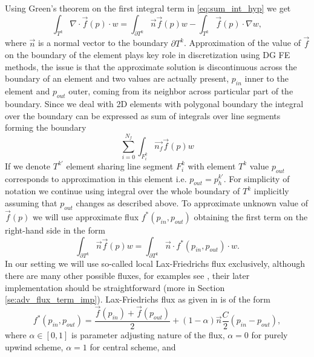 Using Green's theorem on the first integral term in \eqref{eq:sum_int_hyp} we 
get
\begin{equation}
	\label{eq:hyp_term}
	\int_{T^k} \nabla\cdot \vec{f}(p)\cdot w = %
	\int_{\partial{T^k}} \vec{n}\vec{f}(p)w - \int_{T^k} \vec{f}(p)\cdot\nabla w,
\end{equation}
where $\vec{n}$ is a normal vector to the boundary $\partial T^k$. 
Approximation of the value of $\vec{f}$ on the boundary of the element plays 
key role in 
discretization using DG FE methods, the issue is that the 
approximate solution is discontinuous across the boundary of an element and two 
values are actually present, $p_{in}$ inner to the element and $p_{out}$ outer, 
coming from its neighbor across particular part of the boundary. Since we deal with 2D 
elements with polygonal boundary the integral over the boundary can be expressed as sum 
of integrals over line segments forming the boundary
\begin{equation}
	\sum_{i=0}^{N_f} \int_{F^k_i} \vec{n_f}\vec{f}(p)w
\end{equation}
If we denote $T^{k'}$ element sharing line segment $F^k_i$ with element $T^k$
value $p_{out}$ corresponds to approximation in this element i.e. $p_{out} = 
p^{k'}_h$. For simplicity of notation we continue using integral over the whole 
boundary of $T^k$ implicitly assuming that $p_{out}$ changes as described above. To 
approximate unknown value of $\vec{f}(p)$  we will use approximate flux $f^*(p_{in}, 
p_{out})$ obtaining the first term on the right-hand side in the form
\begin{equation}
	\label{eq:flux_integral}
	\int_{\partial{T^k}} \vec{n}\vec{f}(p)w = \int_{\partial{T^k}} \vec{n} 
	\cdot f^{*} (p_{in}, p_{out})\cdot w.
\end{equation}
In our setting we will use so-called local Lax-Friedrichs flux 
exclusively, although there are many other possible fluxes, for examples see 
\cite{Kucera, Cockburn2001a}, their later implementation should be straightforward (more 
in Section \ref{se:adv_flux_term_imp}). Lax-Friedrichs flux as given in 
\cite{Hesthaven2008} 
is of the form
\begin{equation}
	\label{eq:lax-frieflux}
	f^{*}(p_{in}, p_{out}) =   \frac{\vec{f}(p_{in}) + \vec{f}(p_{out})}{2}  + (1-\alpha) \vec{n}\frac{C}{2}(p_{in} - 
	p_{out}),
\end{equation}
where $\alpha \in [0, 1]$ is parameter adjusting nature of the flux, $\alpha = 0$ for purely upwind scheme, 
$\alpha = 1$ for central scheme,  and
